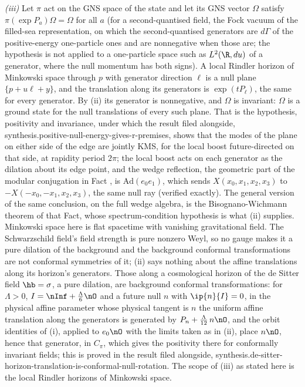 \emph{(iii)} Let $\pi$ act on the GNS space of the state and let its GNS vector $\Omega$ satisfy $\pi(\exp P_{a})\Omega = \Omega$ for all $a$ (for a second-quantised field, the Fock vacuum of the filled-sea representation, on which the second-quantised generators are $d\Gamma$ of the positive-energy one-particle ones and are nonnegative when those are; the hypothesis is not applied to a one-particle space such as $L^{2}(\R, du)$ of a generator, where the null momentum has both signs). A local Rindler horizon of Minkowski space through $p$ with generator direction $\ell$ is a null plane $\{p + u\ell + y\}$, and the translation along its generators is $\exp(tP_{\ell})$, the same for every generator. By (ii) its generator is nonnegative, and $\Omega$ is invariant: $\Omega$ is a ground state for the null translations of every such plane. That is the hypothesis, positivity and invariance, under which the result filed alongside, synthesis.positive-null-energy-gives-r-premises, shows that the modes of the plane on either side of the edge are jointly KMS, for the local boost future-directed on that side, at rapidity period $2\pi$; the local boost acts on each generator as the dilation about its edge point, and the wedge reflection, the geometric part of the modular conjugation in Fact , is $\mathrm{Ad}(e_{0}e_{1})$, which sends $X(x_{0}, x_{1}, x_{2}, x_{3})$ to $-X(-x_{0}, -x_{1}, x_{2}, x_{3})$, the same null ray (verified exactly). The general version of the same conclusion, on the full wedge algebra, is the Bisognano-Wichmann theorem of that Fact, whose spectrum-condition hypothesis is what (ii) supplies. Minkowski space here is flat spacetime with vanishing gravitational field. The Schwarzschild field's field strength is pure nonzero Weyl, so no gauge makes it a pure dilation of the background and the background conformal transformations are not conformal symmetries of it; (ii) says nothing about the affine translations along its horizon's generators. Those along a cosmological horizon of the de Sitter field $\hb = \sigma$, a pure dilation, are background conformal transformations: for $\Lambda > 0$, $I = \nInf + \tfrac{\Lambda}{6}\nO$ and a future null $n$ with $\ip{n}{I} = 0$, in the physical affine parameter whose physical tangent is $n$ the uniform affine translation along the generators is generated by $P_{n} + \tfrac{\Lambda}{12}\,n\nO$, and the orbit identities of (i), applied to $e_{0}\nO$ with the limits taken as in (ii), place $n\nO$, hence that generator, in $C_{\pi}$, which gives the positivity there for conformally invariant fields; this is proved in the result filed alongside, synthesis.de-sitter-horizon-translation-is-conformal-null-rotation. The scope of (iii) as stated here is the local Rindler horizons of Minkowski space.
